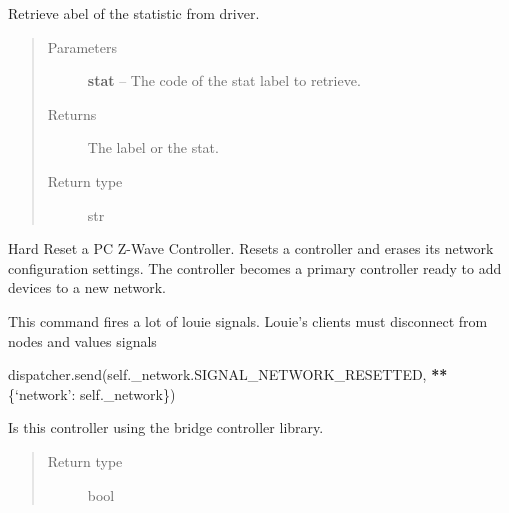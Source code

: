 \documentclass[letterpaper,10pt,english]{sphinxmanual}
\begin{document}
\begin{fulllineitems}
\begin{fulllineitems}
\begin{quote}
\begin{description}
\end{description}\end{quote}

\end{fulllineitems}


\begin{fulllineitems}
\label{controller:openzwave.controller.ZWaveController.get_stats_label}
Retrieve abel of the statistic from driver.
\begin{quote}\begin{description}
\item[{Parameters}] \leavevmode
\textbf{stat} -- The code of the stat label to retrieve.

\item[{Returns}] \leavevmode
The label or the stat.

\item[{Return type}] \leavevmode
str

\end{description}\end{quote}

\end{fulllineitems}


\begin{fulllineitems}
\label{controller:openzwave.controller.ZWaveController.hard_reset}
Hard Reset a PC Z-Wave Controller.
Resets a controller and erases its network configuration settings.  The
controller becomes a primary controller ready to add devices to a new network.

This command fires a lot of louie signals.
Louie's clients must disconnect from nodes and values signals

dispatcher.send(self.\_network.SIGNAL\_NETWORK\_RESETTED, {\color{red}\bfseries{}**}\{`network': self.\_network\})

\end{fulllineitems}


\begin{fulllineitems}
\label{controller:openzwave.controller.ZWaveController.is_bridge_controller}
Is this controller using the bridge controller library.
\begin{quote}\begin{description}
\item[{Return type}] \leavevmode
bool


\end{description}
\end{quote}
\end{fulllineitems}
\end{fulllineitems}
\end{document}
